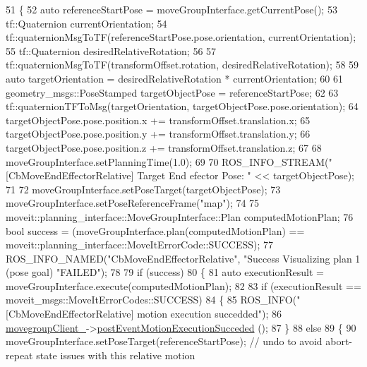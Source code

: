 \begin{DoxyCode}
51 \{
52     \textcolor{keyword}{auto} referenceStartPose = moveGroupInterface.getCurrentPose();
53     tf::Quaternion currentOrientation;
54     tf::quaternionMsgToTF(referenceStartPose.pose.orientation, currentOrientation);
55     tf::Quaternion desiredRelativeRotation;
56 
57     tf::quaternionMsgToTF(transformOffset.rotation, desiredRelativeRotation);
58 
59     \textcolor{keyword}{auto} targetOrientation = desiredRelativeRotation * currentOrientation;
60 
61     geometry\_msgs::PoseStamped targetObjectPose = referenceStartPose;
62 
63     tf::quaternionTFToMsg(targetOrientation, targetObjectPose.pose.orientation);
64     targetObjectPose.pose.position.x += transformOffset.translation.x;
65     targetObjectPose.pose.position.y += transformOffset.translation.y;
66     targetObjectPose.pose.position.z += transformOffset.translation.z;
67 
68     moveGroupInterface.setPlanningTime(1.0);
69 
70     ROS\_INFO\_STREAM(\textcolor{stringliteral}{"[CbMoveEndEffectorRelative] Target End efector Pose: "} << targetObjectPose);
71 
72     moveGroupInterface.setPoseTarget(targetObjectPose);
73     moveGroupInterface.setPoseReferenceFrame(\textcolor{stringliteral}{"map"});
74 
75     moveit::planning\_interface::MoveGroupInterface::Plan computedMotionPlan;
76     \textcolor{keywordtype}{bool} success = (moveGroupInterface.plan(computedMotionPlan) == 
      moveit::planning\_interface::MoveItErrorCode::SUCCESS);
77     ROS\_INFO\_NAMED(\textcolor{stringliteral}{"CbMoveEndEffectorRelative"}, \textcolor{stringliteral}{"Success Visualizing plan 1 (pose goal) %
       \textcolor{stringliteral}{"FAILED"});
78 
79     \textcolor{keywordflow}{if} (success)
80     \{
81         \textcolor{keyword}{auto} executionResult = moveGroupInterface.execute(computedMotionPlan);
82 
83         \textcolor{keywordflow}{if} (executionResult == moveit\_msgs::MoveItErrorCodes::SUCCESS)
84         \{
85             ROS\_INFO(\textcolor{stringliteral}{"[CbMoveEndEffectorRelative] motion execution succedded"});
86             \hyperlink{classmove__group__interface__client_1_1CbMoveEndEffectorRelative_a979ec9c309b1b52a0d0e254b49865fdc}{movegroupClient\_}->\hyperlink{classmove__group__interface__client_1_1ClMoveGroup_a1b617e0018790b8ebf23aea75eb7acba}{postEventMotionExecutionSucceded}
      ();
87         \}
88         \textcolor{keywordflow}{else}
89         \{
90             moveGroupInterface.setPoseTarget(referenceStartPose); \textcolor{comment}{// undo to avoid abort-repeat state
       issues with this relative motion}
}
\end{DoxyCode}
